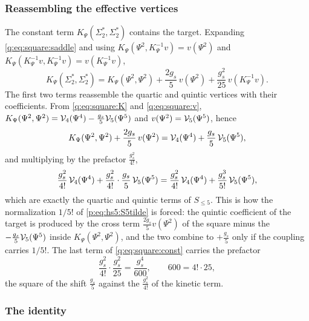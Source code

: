\subsubsection{Reassembling the effective vertices}
\label{q:sec:square:reassemble}

The constant term $K_\Psi(\Sigma_2^*,\Sigma_2^*)$ contains the target.
Expanding \eqref{q:eq:square:saddle} and using $K_\Psi(\Psi^2,K_\Psi^{-1}v)=v(\Psi^2)$ and $K_\Psi(K_\Psi^{-1}v,K_\Psi^{-1}v)=v(K_\Psi^{-1}v)$,
\begin{equation}
  \label{q:eq:square:const}
  K_\Psi(\Sigma_2^*, \Sigma_2^*)
    = K_\Psi(\Psi^2, \Psi^2)
      + \frac{2 g_s}{5} \, v(\Psi^2)
      + \frac{g_s^2}{25} \, v(K_\Psi^{-1} v).
\end{equation}
The first two terms reassemble the quartic and quintic vertices with their coefficients.
From \eqref{q:eq:square:K} and \eqref{q:eq:square:v}, $K_\Psi(\Psi^2,\Psi^2)={\mathcal{V}}_4(\Psi^4)-\frac{g_s}{5}{\mathcal{V}}_5(\Psi^5)$ and $v(\Psi^2)={\mathcal{V}}_5(\Psi^5)$, hence
\begin{equation}
  K_\Psi(\Psi^2, \Psi^2) + \frac{2 g_s}{5} \, v(\Psi^2)
    = {\mathcal{V}}_4(\Psi^4) + \frac{g_s}{5} \, {\mathcal{V}}_5(\Psi^5),
\end{equation}
and multiplying by the prefactor $\frac{g_s^2}{4!}$,
\begin{equation}
  \frac{g_s^2}{4!} \, {\mathcal{V}}_4(\Psi^4) + \frac{g_s^2}{4!} \cdot \frac{g_s}{5} \, {\mathcal{V}}_5(\Psi^5)
    = \frac{g_s^2}{4!} \, {\mathcal{V}}_4(\Psi^4) + \frac{g_s^3}{5!} \, {\mathcal{V}}_5(\Psi^5),
\end{equation}
which are exactly the quartic and quintic terms of $S_{\le5}$.
This is how the normalization $1/5!$ of \eqref{p:eq:hs5:S5tilde} is forced: the quintic coefficient of the target is produced by the cross term $\frac{2g_s}{5}v(\Psi^2)$ of the square minus the $-\frac{g_s}{5}{\mathcal{V}}_5(\Psi^5)$ inside $K_\Psi(\Psi^2,\Psi^2)$, and the two combine to $+\frac{g_s}{5}$ only if the coupling carries $1/5!$.
The last term of \eqref{q:eq:square:const} carries the prefactor
\begin{equation}
  \frac{g_s^2}{4!} \cdot \frac{g_s^2}{25}
    = \frac{g_s^4}{600},
  \qquad
  600 = 4! \cdot 25,
\end{equation}
the square of the shift $\frac{g_s}{5}$ against the $\frac{g_s^2}{4!}$ of the kinetic term.

\subsubsection{The identity}
\label{q:sec:square:identity}

